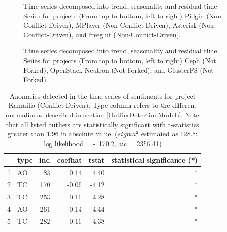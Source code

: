 \documentclass[12pt,letterpaper]{gthesis2}  %
\begin{document}
\begin{figure}[!htbp]
\hspace{6ex}
\vspace{6ex}
\vspace{6ex}
\hspace{6ex}
\vspace{4ex}
\caption{Time series decomposed into trend, seasonality and residual time Series for projects (From top to bottom, left to right) Pidgin (Non-Conflict-Driven), MPlayer (Non-Conflict-Driven), Asterisk (Non-Conflict-Driven), and freeglut (Non-Conflict-Driven).}
\label{figureDecpmposed_5to8}
\end{figure}

\begin{figure}[!htbp]
\hspace{6ex}
\vspace{6ex}
\vspace{6ex}
\hspace{6ex}
\caption{Time series decomposed into trend, seasonality and residual time Series for projects (From top to bottom, left to right) Ceph (Not Forked), OpenStack Neutron (Not Forked), and GlusterFS (Not Forked).}
\label{figureDecpmposed_9to12}
\end{figure}


\begin{table}
\centering
\caption{Anomalies detected in the time series of sentiments for project Kamailio (Conflict-Driven). Type column refers to the different anomalies as described in section \ref{OutlierDetectionModels}. Note that all listed outliers are statistically significant with t-statistics greater than 1.96 in absolute value. ($sigma^2$ estimated as 128.8:  log likelihood = -1170.2,  aic = 2356.41)}
\label{AnomaliesKamailio}
\begin{tabular}{rlrrrr}
  \hline
 & type & ind & coefhat & tstat & statistical significance (*) \\ 
  \hline
  1 & AO &  83 & 0.14 & 4.40 & * \\ 
  2 & TC & 170 & -0.09 & -4.12 & *\\ 
  3 & TC & 253 & 0.10 & 4.28  & *\\ 
  4 & AO & 261 & 0.14 & 4.44  & *\\ 
  5 & TC & 282 & -0.10 & -4.38 &  * \\ 
   \hline
\end{tabular}
\end{table}
\end{document}
